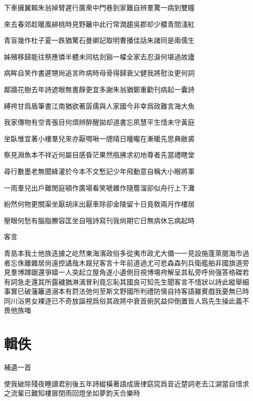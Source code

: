 \documentclass{zhvt-classic-Miya}
\begin{document}
下車擁翼賴朱翁掉臂遲行廣衆中門巷到家難自辨羣驚一病到雙瞳

來去春郊趁暖風緋桃時見野籬中此行常潤趨吳郡却少穠青間淺紅

青盲幾作杜子夏一跌猶驚石曼卿記取明曹播佳話朱諸同是兩儒生

姊殯移歸能往祭應憐半體未同枯剡谿一櫂全家去忍淚何堪過故廬

病眸自笑作書遲甥尙追言昨病時母骨得歸衰父健我將慰汝更何詞

鄰牆花樹去年詩遮眼無書靜更宜多謝朱翁猶鄭重勸刊病起一囊詩

縛袴甘爲盾筆書江南猶欲著孱儒與人家國今非幸爲政難言海大魚

我家傳物有空青張目何煩辨醉醒拋却道書忘夙慧平生惜未守黃庭

坐臥惟宜著小樓羣兒來亦厭啁啾一牕晴日曈曨在漸暖先思典敝裘

察見淵魚本不祥近何屬目感昏茫果然甁拂求初地尊者先當禮瞎堂

尋行數墨老無聞絳灌於今本不文慙記少年飛動意自稱大小眼將軍

一雨羣兒出戶難閒庭頓作廣場看笑嗁雜作隨簷溜卻似舟行上下灘

紛然何物更關渠坐厭胡床出厭車除卻金陵留十日竟敎兩月作樓居

壓眼何愁有腦脂賸容匡坐自哦詩寫刊我尙期它日無病休忘病起時

\begin{fw}客言\end{fw}

青島本我土他族迭據之屹然東海濱政俗多從夷市政尤大備一一見設施蓬萊閱海市過者忘侏離雜居尙遠控譎哉木屐兒客言十年前道過尤可悲森森列兵衛艦舶非國旗道旁見羣博蹲踞還爭嬉一人突起立屋角遂小遺側目視博塲袴解呈其私旁呼尙强答格磔若有詞急走還其所露穢猶淋漓冒利竟忘恥其國良可知先生聞客言不惜狀以詩此縱舉細事實已破藩籬道溺本有罸法弛何至斯文野國所判禮防愼自持客語雖賓戲我憂無已時同川浴男女裸逐已不奇放誕視爲俗其政將中衰首俯尻益仰倒置皆人爲先生操此義不畏他族嗤

\chapter*{輯佚}
\begin{fw}補遺一首\end{fw}

使我破除殘夜睡讀君别後五年詩縱橫著語成唐律窈窕爲音近楚詞老去江湖當自惜求之流輩已難知樓扉閉雨回燈坐如夢鈞天合樂時

\end{document}
